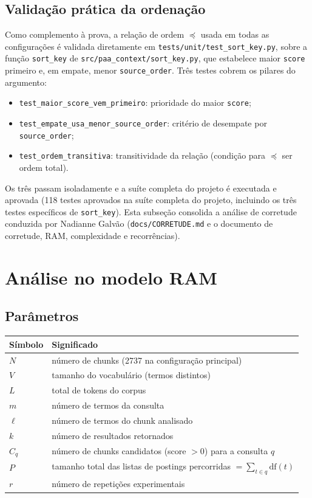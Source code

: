 \documentclass[11pt,a4paper]{article}
\begin{document}
\subsection{Validação prática da ordenação}
Como complemento à prova, a relação de ordem $\preceq$ usada em todas as configurações é validada
diretamente em \texttt{tests/unit/test\_sort\_key.py}, sobre a função \texttt{sort\_key} de
\texttt{src/paa\_context/sort\_key.py}, que estabelece maior \texttt{score} primeiro e, em empate,
menor \texttt{source\_order}. Três testes cobrem os pilares do argumento:
\begin{itemize}[leftmargin=1.4em,itemsep=1pt]
\item \texttt{test\_maior\_score\_vem\_primeiro}: prioridade do maior \texttt{score};
\item \texttt{test\_empate\_usa\_menor\_source\_order}: critério de desempate por \texttt{source\_order};
\item \texttt{test\_ordem\_transitiva}: transitividade da relação (condição para $\preceq$ ser ordem total).
\end{itemize}
Os três passam isoladamente e a suíte completa do projeto é executada e aprovada
(118 testes aprovados na suíte completa do projeto, incluindo os três testes específicos de \texttt{sort\_key}). Esta subseção consolida a análise de corretude conduzida por Nadianne Galvão (\texttt{docs/CORRETUDE.md} e o documento de corretude, RAM, complexidade e
recorrências).

\section{Análise no modelo RAM}
\subsection{Parâmetros}
\begin{table}[h]
\small\centering
\begin{tabularx}{\textwidth}{@{}p{1.6cm}Y@{}}
\toprule
\textbf{Símbolo} & \textbf{Significado}\\
\midrule
$N$ & número de chunks (2737 na configuração principal)\\
$V$ & tamanho do vocabulário (termos distintos)\\
$L$ & total de tokens do corpus\\
$m$ & número de termos da consulta\\
$\ell$ & número de termos do chunk analisado\\
$k$ & número de resultados retornados\\
$C_q$ & número de chunks candidatos (score $>0$) para a consulta $q$\\
$P$ & tamanho total das listas de postings percorridas $=\sum_{t\in q}\mathrm{df}(t)$\\
$r$ & número de repetições experimentais\\
\bottomrule
\end{tabularx}
\end{table}
\end{document}

